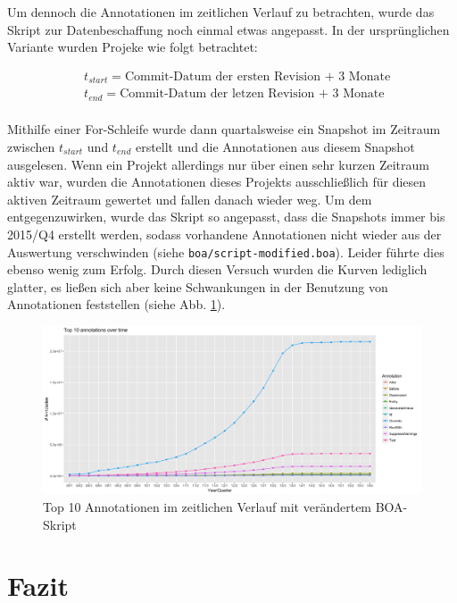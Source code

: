 \documentclass[11pt,a4paper,parskip=full]{scrartcl}
\begin{document}
Um dennoch die Annotationen im zeitlichen Verlauf zu betrachten, wurde das Skript zur Datenbeschaffung noch einmal etwas angepasst. In der ursprünglichen Variante wurden Projeke wie folgt betrachtet:


\begin{align*}
	& t_{start} = \text{Commit-Datum der ersten Revision + 3 Monate}\\
	& t_{end} = \text{Commit-Datum der letzen Revision + 3 Monate}
\end{align*}\\

Mithilfe einer For-Schleife wurde dann quartalsweise ein Snapshot im Zeitraum zwischen $t_{start}$ und $t_{end}$ erstellt und die Annotationen aus diesem Snapshot ausgelesen. Wenn ein Projekt allerdings nur über einen sehr kurzen Zeitraum aktiv war, wurden die Annotationen dieses Projekts ausschließlich für diesen aktiven Zeitraum gewertet und fallen danach wieder weg. Um dem entgegenzuwirken, wurde das Skript so angepasst, dass die Snapshots immer bis 2015/Q4 erstellt werden, sodass vorhandene Annotationen nicht wieder aus der Auswertung verschwinden (siehe \texttt{boa/script-modified.boa}). Leider führte dies ebenso wenig zum Erfolg. Durch diesen Versuch wurden die Kurven lediglich glatter, es ließen sich aber keine Schwankungen in der Benutzung von Annotationen feststellen (siehe Abb. \ref{top10_new}). 

\begin{figure}
	\centering
	\includegraphics[width=\textwidth]{plots/new.png}
	\caption{Top 10 Annotationen im zeitlichen Verlauf mit verändertem BOA-Skript}
	\label{top10_new}
\end{figure}


\section{Fazit}
\end{document}
